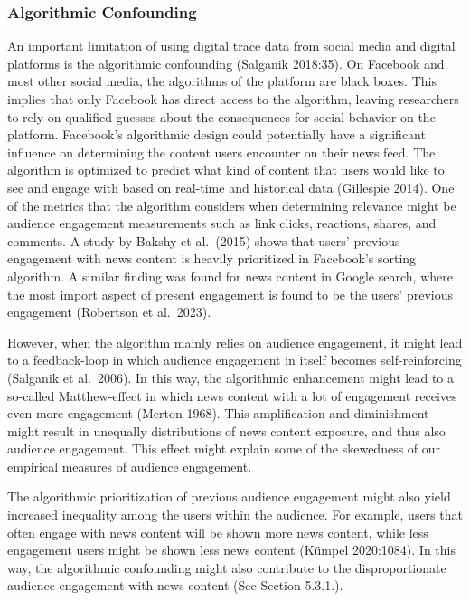 \documentclass[
]{article}
\begin{document}
\hypertarget{algorithmic-confounding}{%
\subsubsection{Algorithmic Confounding}\label{algorithmic-confounding}}

\noindent An important limitation of using digital trace data from
social media and digital platforms is the algorithmic confounding
(Salganik 2018:35). On Facebook and most other social media, the
algorithms of the platform are black boxes. This implies that only
Facebook has direct access to the algorithm, leaving researchers to rely
on qualified guesses about the consequences for social behavior on the
platform. Facebook's algorithmic design could potentially have a
significant influence on determining the content users encounter on
their news feed. The algorithm is optimized to predict what kind of
content that users would like to see and engage with based on real-time
and historical data (Gillespie 2014). One of the metrics that the
algorithm considers when determining relevance might be audience
engagement measurements such as link clicks, reactions, shares, and
comments. A study by Bakshy et al.~(2015) shows that users' previous
engagement with news content is heavily prioritized in Facebook's
sorting algorithm. A similar finding was found for news content in
Google search, where the most import aspect of present engagement is
found to be the users' previous engagement (Robertson et al.~2023).

However, when the algorithm mainly relies on audience engagement, it
might lead to a feedback-loop in which audience engagement in itself
becomes self-reinforcing (Salganik et al.~2006). In this way, the
algorithmic enhancement might lead to a so-called Matthew-effect in
which news content with a lot of engagement receives even more
engagement (Merton 1968). This amplification and diminishment might
result in unequally distributions of news content exposure, and thus
also audience engagement. This effect might explain some of the
skewedness of our empirical measures of audience engagement.

The algorithmic prioritization of previous audience engagement might
also yield increased inequality among the users within the audience. For
example, users that often engage with news content will be shown more
news content, while less engagement users might be shown less news
content (Kümpel 2020:1084). In this way, the algorithmic confounding
might also contribute to the disproportionate audience engagement with
news content (See Section 5.3.1.).
\end{document}

